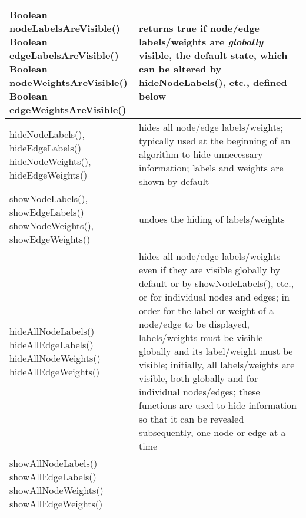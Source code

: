 \begin{table}
  \small
  \centering
  \begin{tabular}{| m{} | m{} |}
    \hline
    \shortstack[l]{
      \textsf{Boolean nodeLabelsAreVisible()}\\
      \textsf{Boolean edgeLabelsAreVisible()}\\
      \textsf{Boolean nodeWeightsAreVisible()}\\
      \textsf{Boolean edgeWeightsAreVisible()}
    }
    &
    returns \textsf{true} if node/edge labels/weights are \emph{globally} visible,
    the default state, which can be altered by \textsf{hideNodeLabels()}, etc.,
    defined below
    \\ \hline
    \shortstack[l]{
      \textsf{hideNodeLabels(), hideEdgeLabels()}\\
      \textsf{hideNodeWeights(), hideEdgeWeights()}
    }
    &
    hides all node/edge labels/weights; typically used at the beginning of an algorithm
    to hide unnecessary information; labels and weights are shown by default
    \\ \hline
    \shortstack[l]{
      \textsf{showNodeLabels(), showEdgeLabels()}\\
      \textsf{showNodeWeights(), showEdgeWeights()}
    }
    &
    undoes the hiding of labels/weights
    \\ \hline
    \shortstack[l]{
      \textsf{hideAllNodeLabels()}\\
      \textsf{hideAllEdgeLabels()}\\
      \textsf{hideAllNodeWeights()}\\
      \textsf{hideAllEdgeWeights()}
    }
    &
    hides all node/edge labels/weights even if they are visible globally
    by default or by
    \textsf{showNodeLabels()}, etc., or for individual nodes and edges;
    in order for the label or weight of a node/edge to be displayed,
    labels/weights must be visible globally and its label/weight must be visible;
    initially, all labels/weights are visible, both globally and for individual
    nodes/edges;
    these functions are used to hide information so that it can be revealed subsequently,
    one node or edge at a time
    \\ \hline
    \shortstack[l]{
      \textsf{showAllNodeLabels()}\\
      \textsf{showAllEdgeLabels()}\\
      \textsf{showAllNodeWeights()}\\
      \textsf{showAllEdgeWeights()}
}
\end{tabular}
\end{table}
